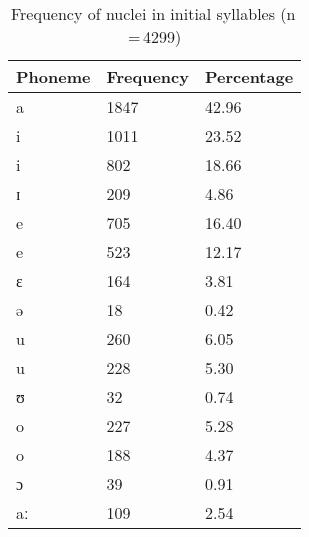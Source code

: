 \begin{table}[pth]\centering
\caption[Frequency of nuclei in initial syllables]{Frequency of nuclei in initial syllables (n\,=\,4299)}
\begin{tabu} to 0.5\textwidth{X X[c] X[c]}
\tableheaderfont\toprule
Phoneme
	& Frequency
	& Percentage
	\\
	
\toprule

a
	& 1847
	& 42.96\pct
	\\

\midrule

i
	& 1011
	& 23.52\pct
	\\

\rowfont{\scriptsize\itshape}
\raggedleft
i
	& 802
	& 18.66\pct
	\\

\rowfont{\scriptsize\itshape}
\raggedleft
ɪ
	& 209
	& 4.86\pct
	\\

\midrule

e
	& 705
	& 16.40\pct
	\\

\rowfont{\scriptsize\itshape}
\raggedleft
e
	& 523
	& 12.17\pct
	\\

\rowfont{\scriptsize\itshape}
\raggedleft
ɛ
	& 164
	& 3.81\pct
	\\

\rowfont{\scriptsize\itshape}
\raggedleft
ə
	& 18
	& 0.42\pct
	\\

\midrule

u
	& 260
	& 6.05\pct
	\\

\rowfont{\scriptsize\itshape}
\raggedleft
u
	& 228
	& 5.30\pct
	\\

\rowfont{\scriptsize\itshape}
\raggedleft
ʊ
	& 32
	& 0.74\pct
	\\

\midrule

o
	& 227
	& 5.28\pct
	\\

\rowfont{\scriptsize\itshape}
\raggedleft
o
	& 188
	& 4.37\pct
	\\

\rowfont{\scriptsize\itshape}
\raggedleft
ɔ
	& 39
	& 0.91\pct
	\\

\midrule

aː
	& 109
	& 2.54\pct
	\\


\end{tabu}
\end{table}
